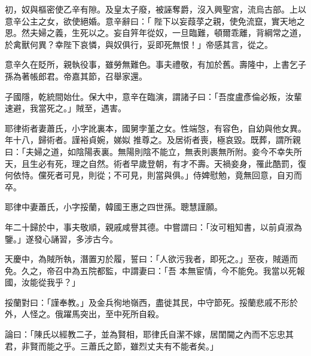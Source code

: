 \begin{pinyinscope}
 初，奴與樞密使乙辛有隙。及皇太子廢，被誣奪爵，沒入興聖宮，流烏古部。上以意辛公主之女，欲使絕婚。意辛辭曰：「
 陛下以妄葭莩之親，使免流竄，實天地之恩。然夫婦之義，生死以之。妄自笄年從奴，一旦臨難，頓爾乖離，背綱常之道，於禽獸何異？幸陛下哀憐，與奴俱行，妥即死無恨！」帝感其言，從之。



 意辛久在貶所，親執役事，雖勞無難色。事夫禮敬，有加於舊。壽隆中，上書乞子孫為著帳郎君。帝嘉其節，召舉家還。



 子國隱，乾統間始仕。保大中，意辛在臨演，謂諸子曰：「吾度盧彥倫必叛，汝輩速避，我當死之。」賊至，遇害。



 耶律術者妻蕭氏，小字訛裏本，國舅孛堇之女。性端愨，有容色，自幼與他女異。年十八，歸術者。謹裕貞婉，娣姒
 推尊之。及居術者喪，極哀毀。既葬，謂所親曰：「夫婦之道，如陰陽表裏。無陽則陰不能立，無表則裹無所附。妾今不幸失所天，且生必有死，理之自然。術者早歲登朝，有才不壽。天禍妾身，罹此酷罰，復何依恃。儻死者可見，則從；不可見，則當與俱。」侍婢慰勉，竟無回意，自刃而卒。



 耶律中妻蕭氏，小字挼蘭，韓國王惠之四世孫。聰慧謹願。



 年二十歸於中，事夫敬順，親戚咸譽其德。中嘗謂曰：「汝可粗知書，以前貞淑為鑒。」遂發心誦習，多涉古今。



 天慶中，為賊所執，潛置刃於履，誓曰：「人欲污我者，即死之。」至夜，賊遁而免。久之，帝召中為五院都監，中謂妻曰：「吾
 本無宦情，今不能免。我當以死報國，汝能從我乎？」



 挼蘭對曰：「謹奉教。」及金兵徇地嶺西，盡徙其民，中守節死。挼蘭悲戚不形於外，人怪之。俄躍馬突出，至中死所自殺。



 論曰：「陳氏以經教二子，並為賢相，耶律氏自潔不嫁，居閨閫之內而不忘忠其君，非賢而能之乎。三蕭氏之節，雖烈丈夫有不能者矣。」



\end{pinyinscope}